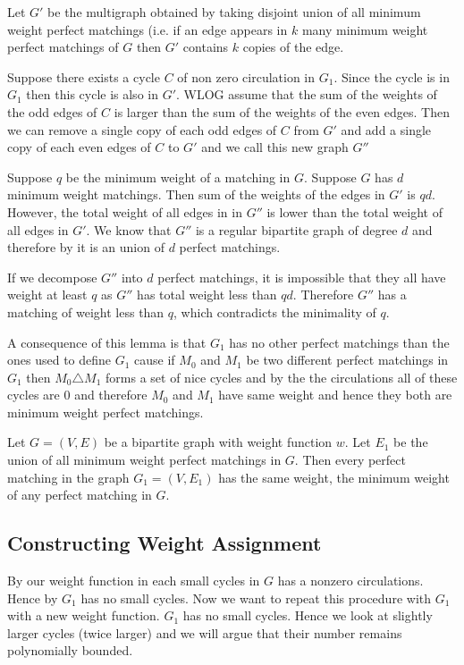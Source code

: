 \begin{alternate-proof}
		Let $G'$ be the multigraph obtained by taking disjoint union of all minimum weight perfect matchings (i.e. if an edge appears in $k$ many minimum weight perfect matchings of $G$ then $G'$ contains  $k$ copies of the edge.
		
		
		Suppose there exists a cycle $C$ of non zero circulation in $G_1$. Since the cycle is in $G_1$ then this cycle is also in $G'$. WLOG  assume that the sum of the weights of the odd edges of $C$ is larger than the sum of the weights of the even edges. Then we can remove a single copy of each odd edges of $C$ from $G'$ and add a single copy of each even edges of $C$ to $G'$ and we call this new graph $G''$
		
		Suppose $q$ be the minimum weight of a matching in $G$. Suppose $G$ has $d$ minimum weight matchings. Then sum of the weights of the edges in $G'$ is $qd$.	However, the total weight of all edges in in $G''$ is lower than the total weight of all edges in $G'$. We know  that $G''$ is a regular bipartite graph of degree $d$ and therefore by  it is an union of $d$ perfect matchings.
		
		If we decompose $G''$ into $d$ perfect matchings, it is impossible that they all have weight at least $q$ as $G''$ has total weight less than $qd$. Therefore $G''$ has a matching of weight less than $q$, which contradicts the minimality of $q$. 
\end{alternate-proof}
A consequence of this lemma is that $G_1$ has no other perfect matchings than the ones used to define $G_1$ cause if $M_0$ and $M_1$ be two different perfect matchings in $G_1$ then $M_0\triangle M_1$ forms a set of nice cycles and by the  the circulations  all of these cycles are 0 and therefore $M_0$ and $M_1$ have same weight and hence they both are minimum weight perfect matchings.
\begin{corolary}{}{}
	Let $G=(V,E)$ be a bipartite graph with weight function $w$. Let $E_1$ be the union of all minimum weight perfect matchings in $G$. Then every perfect matching in the graph $G_1=(V,E_1)$ has the same weight, the minimum weight of any perfect matching in $G$.
\end{corolary}
\subsection{Constructing Weight Assignment}
By our weight function in  each small cycles in $G$ has a nonzero circulations. Hence by  $G_1$ has no small cycles. Now we want to repeat this procedure with $G_1$ with a new weight function. $G_1$ has no small cycles. Hence we look at slightly larger cycles (twice larger) and we will argue that their number remains polynomially bounded.

